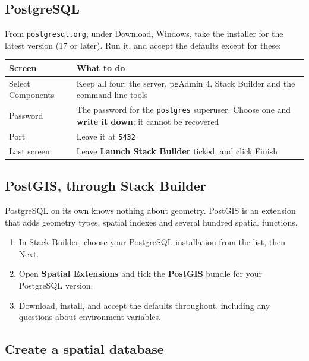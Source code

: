 \documentclass{article}
\newcommand{\cd}[1]{\texttt{#1}}
\begin{document}
\subsection{PostgreSQL}

From \cd{postgresql.org}, under Download, Windows, take the installer
for the latest version (17 or later). Run it, and accept the defaults
except for these:

\begin{tabularx}{\textwidth}{@{}L{4.4cm} X@{}}
\toprule
\textbf{Screen} & \textbf{What to do} \\
\midrule
Select Components & Keep all four: the server, pgAdmin 4, Stack Builder
                   and the command line tools \\
Password          & The password for the \cd{postgres} superuser. Choose
                    one and \textbf{write it down}; it cannot be
                    recovered \\
Port              & Leave it at \cd{5432} \\
Last screen       & Leave \textbf{Launch Stack Builder} ticked, and
                    click Finish \\
\bottomrule
\end{tabularx}

\subsection{PostGIS, through Stack Builder}

PostgreSQL on its own knows nothing about geometry. PostGIS is an
extension that adds geometry types, spatial indexes and several hundred
spatial functions.

\begin{enumerate}
  \item In Stack Builder, choose your PostgreSQL installation from the
        list, then Next.
  \item Open \textbf{Spatial Extensions} and tick the \textbf{PostGIS}
        bundle for your PostgreSQL version.
  \item Download, install, and accept the defaults throughout, including
        any questions about environment variables.
\end{enumerate}

\subsection{Create a spatial database}
\end{document}
